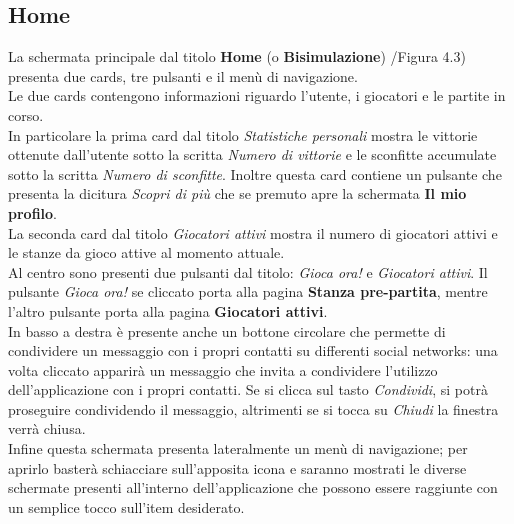 \documentclass[a4paper,11pt,twoside,openright]{report}
\begin{document}
\subsection{Home}
La schermata principale dal titolo \textbf{Home} (o \textbf{Bisimulazione}) /Figura 4.3) presenta due cards, tre pulsanti e il menù di navigazione.\\
Le due cards contengono informazioni riguardo l'utente, i giocatori e le partite in corso.\\ 
In particolare la prima card dal titolo \textit{Statistiche personali}  mostra le vittorie ottenute dall'utente sotto la scritta \textit{Numero di vittorie} e le sconfitte 
accumulate sotto la scritta \textit{Numero di sconfitte}. Inoltre questa card contiene un pulsante che presenta la dicitura \textit{Scopri di più} che se premuto apre la
schermata \textbf{Il mio profilo}.\\
La seconda card dal titolo \textit{Giocatori attivi} mostra il numero di giocatori attivi e le stanze da gioco attive al momento attuale.\\
Al centro sono presenti due pulsanti dal titolo: \textit{Gioca ora!} e \textit{Giocatori attivi}. Il pulsante \textit{Gioca ora!} se cliccato porta alla pagina
\textbf{Stanza pre-partita}, mentre l'altro pulsante porta alla pagina \textbf{Giocatori attivi}.\\
In basso a destra è presente anche un bottone circolare che permette di condividere un messaggio con i propri contatti su differenti social networks: una volta cliccato
apparirà un messaggio che invita a condividere l'utilizzo dell'applicazione con i propri contatti. Se si clicca sul tasto \textit{Condividi}, si potrà proseguire condividendo
il messaggio, altrimenti se si tocca su \textit{Chiudi} la finestra verrà chiusa.\\
Infine questa schermata presenta lateralmente un menù di navigazione; per aprirlo basterà schiacciare sull'apposita icona e saranno mostrati le diverse schermate
presenti all'interno dell'applicazione che possono essere raggiunte con un semplice tocco sull'item desiderato.
\end{document}
